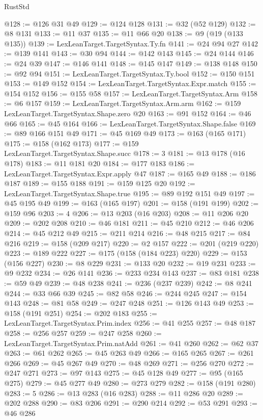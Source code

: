 \begin{lexlean}{RustStd}
\begin{coremodule}
{\begin{coremodule}
{{{{{{{{{{{{@128 := @126 @31 @49
@129 := @124 @128
@131 := @32 (@52 @129)
@132 := @8 @131
@133 := @11 @37
@135 := @11 @66 @20
@138 := @9 (@19 (@133 @135))
@139 := LexLeanTarget.TargetSyntax.Ty.fn
@141 := @24 @94 @27
@142 := @139 @141
@143 := @30 @94
@144 := @142 @143
@145 := @24 @144
@146 := @24 @39
@147 := @146 @141
@148 := @145 @147
@149 := @138 @148
@150 := @92 @94
@151 := LexLeanTarget.TargetSyntax.Ty.bool
@152 := @150 @151
@153 := @149 @152
@154 := LexLeanTarget.TargetSyntax.Expr.match
@155 := @154 @152
@156 := @155 @58
@157 := LexLeanTarget.TargetSyntax.Arm
@158 := @6 @157
@159 := LexLeanTarget.TargetSyntax.Arm.arm
@162 := @159 LexLeanTarget.TargetSyntax.Shape.zero @20
@163 := @91 @152
@164 := @46 @66
@165 := @45 @164
@166 := LexLeanTarget.TargetSyntax.Shape.false
@169 := @89 @166 @151 @49
@171 := @45 @169 @49
@173 := @163 (@165 @171)
@175 := @158 (@162 @173)
@177 := @159 LexLeanTarget.TargetSyntax.Shape.succ
@178 := 3
@181 := @13 @178 (@16 @178)
@183 := @11 @181 @20
@184 := @177 @183
@186 := LexLeanTarget.TargetSyntax.Expr.apply @47
@187 := @165 @49
@188 := @186 @187
@189 := @155 @188
@191 := @159 @125 @20
@192 := LexLeanTarget.TargetSyntax.Shape.true
@195 := @89 @192 @151 @49
@197 := @45 @195 @49
@199 := @163 (@165 @197)
@201 := @158 (@191 @199)
@202 := @159 @96
@203 := 4
@206 := @13 @203 (@16 @203)
@208 := @11 @206 @20
@209 := @202 @208
@210 := @46 @181
@211 := @45 @210
@212 := @46 @206
@214 := @45 @212 @49
@215 := @211 @214
@216 := @48 @215
@217 := @84 @216
@219 := @158 (@209 @217)
@220 := @2 @157
@222 := @201 (@219 @220)
@223 := @189 @222
@227 := @175 (@158 (@184 @223) @220)
@229 := @153 (@156 @227)
@230 := @8 @229
@231 := @133 @20
@232 := @19 @231
@233 := @9 @232
@234 := @26 @141
@236 := @233 @234 @143
@237 := @83 @181
@238 := @59 @49
@239 := @48 @238
@241 := @236 (@237 @239)
@242 := @8 @241
@244 := @33 @66 @39
@245 := @82 @58
@246 := @244 @245
@247 := @154 @143
@248 := @81 @58
@249 := @247 @248
@251 := @126 @143 @49
@253 := @158 (@191 @251)
@254 := @202 @183
@255 := LexLeanTarget.TargetSyntax.Prim.index
@256 := @41 @255
@257 := @48 @187
@258 := @256 @257
@259 := @247 @258
@260 := LexLeanTarget.TargetSyntax.Prim.natAdd
@261 := @41 @260
@262 := @62 @37
@263 := @61 @262
@265 := @45 @263 @49
@266 := @165 @265
@267 := @261 @266
@269 := @45 @267 @49
@270 := @48 @269
@271 := @256 @270
@272 := @247 @271
@273 := @97 @143
@275 := @45 @128 @49
@277 := @95 (@165 @275)
@279 := @45 @277 @49
@280 := @273 @279
@282 := @158 (@191 @280)
@283 := 5
@286 := @13 @283 (@16 @283)
@288 := @11 @286 @20
@289 := @202 @288
@290 := @83 @206
@291 := @290 @214
@292 := @53 @291
@293 := @46 @286
}}}}}}}}}}}}
\end{coremodule}}
\end{coremodule}
\end{lexlean}
